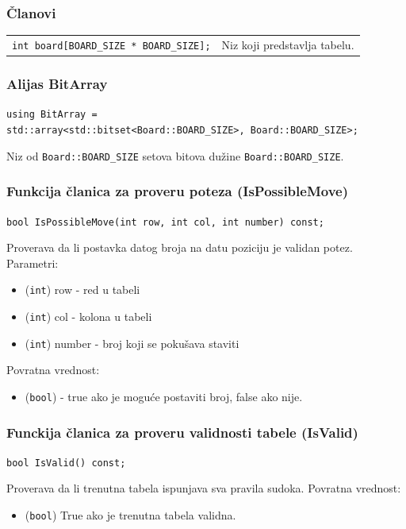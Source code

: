 \documentclass[a4paper]{article}
\begin{document}
    \subsubsection{Članovi}
    \begin{tabular}{ l l }
        \par\texttt{int board[BOARD\_SIZE * BOARD\_SIZE];} & Niz koji predstavlja tabelu.\\
    \end{tabular}

    \subsubsection{Alijas BitArray}
    {\parindent0pt
    \texttt{using BitArray = }\\
    \texttt{std::array<std::bitset<Board::BOARD\_SIZE>, Board::BOARD\_SIZE>;}
    }
    \par Niz od \texttt{Board::BOARD\_SIZE} setova bitova dužine \texttt{Board::BOARD\_SIZE}.
    
    \subsubsection{Funkcija članica za proveru poteza (IsPossibleMove)}
    \texttt{bool IsPossibleMove(int row, int col, int number) const;}
    \par Proverava da li postavka datog broja na datu poziciju je validan potez.
    Parametri:
    \begin{itemize}
        \item (\texttt{int}) row - red u tabeli
        \item (\texttt{int}) col - kolona u tabeli
        \item (\texttt{int}) number - broj koji se pokušava staviti
    \end{itemize}
    Povratna vrednost:
    \begin{itemize}
        \item (\texttt{bool}) - true ako je moguće postaviti broj, false ako nije.
    \end{itemize}

    \subsubsection{Funckija članica za proveru validnosti tabele (IsValid)}
    \texttt{bool IsValid() const;}
    \par Proverava da li trenutna tabela ispunjava sva pravila sudoka.
    Povratna vrednost:
    \begin{itemize}
        \item (\texttt{bool}) True ako je trenutna tabela validna.
    \end{itemize}
\end{document}
